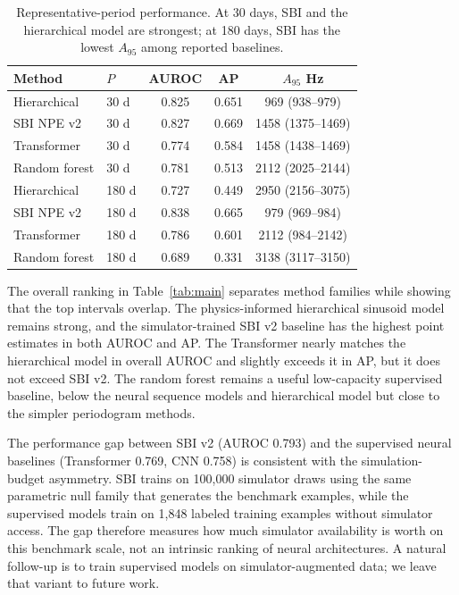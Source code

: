\documentclass{article}
\begin{document}
\begin{table}[t]
  \centering
  \footnotesize
  \setlength{\tabcolsep}{3.3pt}
  \caption{Representative-period performance.  At 30 days, SBI and the hierarchical model are strongest; at 180 days, SBI has the lowest \(A_{95}\) among reported baselines.}
  \label{tab:representative}
  \begin{tabular}{llccc}
    \toprule
    Method & \(P\) & AUROC & AP & \(A_{95}\) Hz \\
    \midrule
    Hierarchical & 30 d & 0.825 & 0.651 & 969 (938--979) \\
    SBI NPE v2 & 30 d & 0.827 & 0.669 & 1458 (1375--1469) \\
    Transformer & 30 d & 0.774 & 0.584 & 1458 (1438--1469) \\
    Random forest & 30 d & 0.781 & 0.513 & 2112 (2025--2144) \\
    \midrule
    Hierarchical & 180 d & 0.727 & 0.449 & 2950 (2156--3075) \\
    SBI NPE v2 & 180 d & 0.838 & 0.665 & 979 (969--984) \\
    Transformer & 180 d & 0.786 & 0.601 & 2112 (984--2142) \\
    Random forest & 180 d & 0.689 & 0.331 & 3138 (3117--3150) \\
    \bottomrule
  \end{tabular}
\end{table}

The overall ranking in Table~\ref{tab:main} separates method families while showing that the top intervals overlap.  The physics-informed hierarchical sinusoid model remains strong, and the simulator-trained SBI v2 baseline has the highest point estimates in both AUROC and AP.  The Transformer nearly matches the hierarchical model in overall AUROC and slightly exceeds it in AP, but it does not exceed SBI v2.  The random forest remains a useful low-capacity supervised baseline, below the neural sequence models and hierarchical model but close to the simpler periodogram methods.

The performance gap between SBI v2 (AUROC 0.793) and the supervised neural baselines (Transformer 0.769, CNN 0.758) is consistent with the simulation-budget asymmetry.  SBI trains on 100,000 simulator draws using the same parametric null family that generates the benchmark examples, while the supervised models train on 1,848 labeled training examples without simulator access.  The gap therefore measures how much simulator availability is worth on this benchmark scale, not an intrinsic ranking of neural architectures.  A natural follow-up is to train supervised models on simulator-augmented data; we leave that variant to future work.
\end{document}

